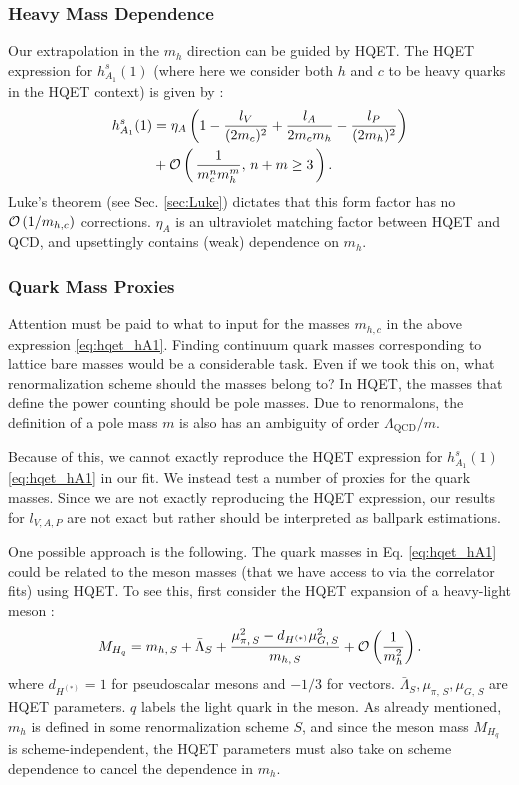 \subsubsection{Heavy Mass Dependence}
\label{sec:BsDsstar_heavymass}

Our extrapolation in the $m_h$ direction can be guided by HQET. The HQET expression for $h^s_{A_1}(1)$ (where here we consider both $h$ and $c$ to be heavy quarks in the HQET context) is given by \cite{Falk:1992wt,Mannel:1994kv}:
\begin{align}
  \label{eq:hqet_hA1}
  h^s_{A_1}(1) &= \eta_A \left( 1 - {l_V\over (2m_c)^2} + {l_A \over 2 m_c m_h} - { l_P \over (2m_h)^2 } \right)  \\ \nonumber &+ \mathcal{O}\left( \, {1\over m_c^n m_h^m}, \, n+m\geq 3 \, \right).
\end{align}
Luke's theorem (see Sec. \ref{sec:Luke}) dictates that this form factor has no $\mathcal{O}\left( 1/m_{h,c} \right)$ corrections. $\eta_A$ is an ultraviolet matching factor between HQET and QCD, and upsettingly contains (weak) dependence on $m_h$.

\subsubsection{Quark Mass Proxies}
\label{sec:massambiguities}

Attention must be paid to what to input for the masses $m_{h,c}$ in the above expression \eqref{eq:hqet_hA1}. Finding continuum quark masses corresponding to lattice bare masses would be a considerable task. Even if we took this on, what renormalization scheme should the masses belong to? In HQET, the masses that define the power counting should be pole masses. Due to renormalons, the definition of a pole mass $m$ is also has an ambiguity of order $\Lambda_{\text{QCD}}/m$.

Because of this, we cannot exactly reproduce the HQET expression for $h_{A_1}^s(1)$ \eqref{eq:hqet_hA1} in our fit. We instead test a number of proxies for the quark masses. Since we are not exactly reproducing the HQET expression, our results for $l_{V,A,P}$ are not exact but rather should be interpreted as ballpark estimations.

One possible approach is the following. The quark masses in Eq. \eqref{eq:hqet_hA1} could be related to the meson masses (that we have access to via the correlator fits) using HQET. To see this, first consider the HQET expansion of a heavy-light meson \cite{Bazavov:2018omf}:
\begin{align}
  \label{eq:hqet_mass}
  M_{H_q} = m_{h,\,S} + \bar{\Lambda}_S + { \mu^2_{\pi,\,S} - d_{H^{(*)}} \mu^2_{G,\,S} \over m_{h,\,S}} + \mathcal{O}\left({1\over m_h^2}\right).
\end{align}
where $d_{H^{(*)}} = 1$ for pseudoscalar mesons and $-1/3$ for vectors. $\bar{\Lambda}_S,\mu_{\pi,\,S},\mu_{G,\,S}$ are HQET parameters. $q$ labels the light quark in the meson. As already mentioned, $m_h$ is defined in some renormalization scheme $S$, and since the meson mass $M_{H_q}$ is scheme-independent, the HQET parameters must also take on scheme dependence to cancel the dependence in $m_h$.

